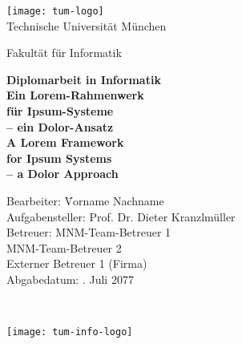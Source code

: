 \begin{center}

    \texttt{[image: tum-logo]}\\
    \vspace{.5cm}
    {\Large \sc Technische Universität München}\\


    \vspace{.5cm}

    {\huge \sc Fakultät für Informatik\\[1mm]}


    \vspace{1cm}

    {\Large \textbf{Diplomarbeit in Informatik}}\\ %

    \vspace{1.5cm}
    {\huge \textbf{Ein Lorem-Rahmenwerk}}\\ %
    \vspace*{3mm}
    {\huge \textbf{für Ipsum-Systeme}}\\
    \vspace*{3mm}
    {\huge \textbf{-- ein Dolor-Ansatz}}\\

    \vspace{1cm}
    {\huge \textbf{A Lorem Framework}}\\ %
    \vspace*{3mm}
    {\huge \textbf{for Ipsum Systems}}\\
    \vspace*{3mm}
    {\huge \textbf{-- a Dolor Approach}}\\
    \vspace{1cm}

    \parbox{1cm}{
      \begin{large}
        \begin{tabbing}
          Bearbeiter: \hspace{1.5cm}
            \=Vorname Nachname\\[2mm]
    Aufgabensteller: \>Prof. Dr. Dieter Kranzlmüller\\[2mm]
    Betreuer: \>MNM-Team-Betreuer 1\\ %
    \>MNM-Team-Betreuer 2\\
    \>Externer Betreuer 1 (Firma)\\[5mm]
    Abgabedatum: . Juli 2077\\
        \end{tabbing}
      \end{large}
    }\\

    \vspace{.3cm}

    \texttt{[image: tum-info-logo]}

\end{center}
